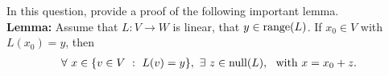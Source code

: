 \begin{question}\label{que:LemmaGenericSols}
	\normalfont
	
	In this question, provide a proof of the following important lemma. \\
	
	\textbf{Lemma:} Assume that $L:V\to W$ is linear, that $y\in\textnormal{range}(L)$. If $x_0\in V$ with $L(x_0)=y$, then 
	\begin{align*}
		\forall\ x\in\{ v\in V\ :\ L(v)=y \},\ \exists\ z\in \textnormal{null}(L),\ \ \text{with}\ x=x_0+z.
	\end{align*}
\end{question}